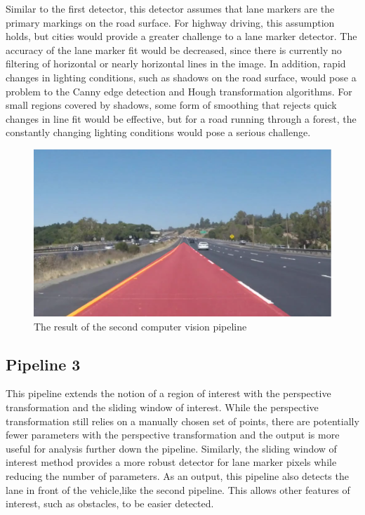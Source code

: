\documentclass[conf]{new-aiaa}
\begin{document}
Similar to the first detector, this detector assumes that lane markers are the primary markings on the road surface.  For highway driving, this assumption holds, but cities would provide a greater challenge to a lane marker detector.  The accuracy of the lane marker fit would be decreased, since there is currently no filtering of horizontal or nearly horizontal lines in the image.  In addition, rapid changes in lighting conditions, such as shadows on the road surface, would pose a problem to the Canny edge detection and Hough transformation algorithms.  For small regions covered by shadows, some form of smoothing that rejects quick changes in line fit would be effective, but for a road running through a forest, the constantly changing lighting conditions would pose a serious challenge.

\begin{figure}[h!]
    \centering
    \includegraphics[scale = 0.5]{"./images/cv_final"}
    \caption{The result of the second computer vision pipeline}
    \label{fig:cv_final}
\end{figure}

\subsection{Pipeline 3}
This pipeline extends the notion of a region of interest with the perspective transformation and the sliding window of interest.  While the perspective transformation still relies on a manually chosen set of points, there are potentially fewer parameters with the perspective transformation and the output is more useful for analysis further down the pipeline.  Similarly, the sliding window of interest method provides a more robust detector for lane marker pixels while reducing the number of parameters.  As an output, this pipeline also detects the lane in front of the vehicle,like the second pipeline.  This allows other features of interest, such as obstacles, to be easier detected.
\end{document}
